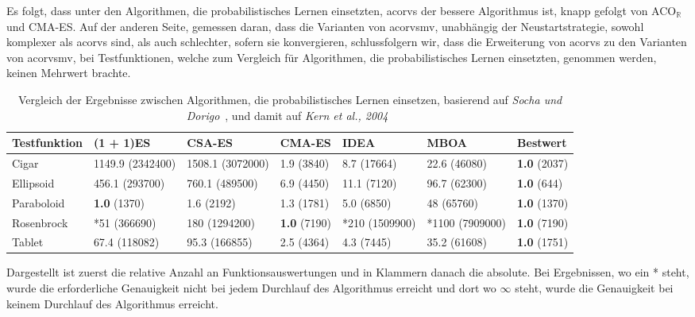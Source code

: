 \documentclass[fontsize=12, a4aper]{scrartcl}
\begin{document}
	Es folgt, dass unter den Algorithmen, die probabilistisches Lernen einsetzten, \ac{acorvs} der bessere Algorithmus ist, knapp gefolgt von ACO\(_\mathbb{R}\) und CMA-ES. Auf der anderen Seite, gemessen daran, dass die Varianten von \ac{acorvsmv}, unabhängig der Neustartstrategie, sowohl komplexer als \ac{acorvs} sind, als auch schlechter, sofern sie konvergieren, schlussfolgern wir, dass die Erweiterung von \ac{acorvs} zu den Varianten von \ac{acorvsmv}, bei Testfunktionen, welche zum Vergleich für Algorithmen, die probabilistisches Lernen einsetzten, genommen werden, keinen Mehrwert brachte.
	
	\begin{table}[H]
		
		\caption{Vergleich der Ergebnisse zwischen Algorithmen, die probabilistisches Lernen einsetzen, basierend auf \textit{Socha und Dorigo}~\cite{socha2008ant}, und damit auf \textit{Kern et al., 2004}~\cite{kern2004learning}}
		
		\label{subsec:Vergleich_Von_ACO_R_ACO_R_Very_Simple_Und_Iterationen:tab:Vergleich_Probabilistisches_Lernen_Teil_1}
		
		\scriptsize
		
		\begin{tabularx}{\linewidth}{l l l l l l l}
			
			\toprule
			
			Testfunktion & (1 + 1)ES & CSA-ES & CMA-ES & IDEA & MBOA & Bestwert\\
			
			\midrule
			
			Cigar & 1149.9 (2342400) & 1508.1 (3072000) & 1.9 (3840) & 8.7 (17664) & 22.6 (46080) & \textbf{1.0} (2037)\\
			
			Ellipsoid & 456.1 (293700) & 760.1 (489500) & 6.9 (4450) & 11.1 (7120) & 96.7 (62300) & \textbf{1.0} (644)\\
			
			Paraboloid & \textbf{1.0} (1370) & 1.6 (2192) & 1.3 (1781) & 5.0 (6850) & 48 (65760)  & \textbf{1.0} (1370)\\
			
			Rosenbrock & *51 (366690) & 180 (1294200) & \textbf{1.0} (7190) & *210 (1509900) & *1100 (7909000) & \textbf{1.0} (7190)\\
			
			Tablet & 67.4 (118082) & 95.3 (166855) & 2.5 (4364) & 4.3 (7445) & 35.2 (61608) & \textbf{1.0} (1751)\\
			
			\bottomrule
			
		\end{tabularx}
		
		\smallskip
		
		Dargestellt ist zuerst die relative Anzahl an Funktionsauswertungen und in Klammern danach die absolute. Bei Ergebnissen, wo ein * steht, wurde die erforderliche Genauigkeit nicht bei jedem Durchlauf des Algorithmus erreicht und dort wo \(\infty\) steht, wurde die Genauigkeit bei keinem Durchlauf des Algorithmus erreicht.\hfill\newline
		
	\end{table}
	
\end{document}
